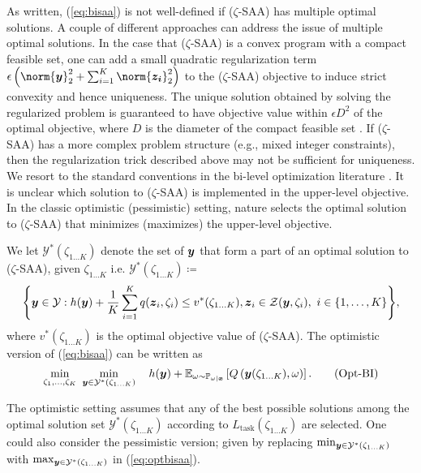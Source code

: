 As written, (\ref{eq:bisaa}) is not well-defined if \hbox{($\zeta$-SAA)} has multiple optimal solutions. A couple of different approaches can address the issue of multiple optimal solutions.  In the case that \hbox{($\zeta$-SAA)} is a convex program with a compact feasible set, one can add a small quadratic regularization term $\epsilon \left(\norm{\bs{y}}_2^2 + \sum_{i=1}^K \norm{\bs{z_i}}_2^2 \right)$ to the \hbox{($\zeta$-SAA)} objective to induce strict convexity and hence uniqueness. The unique solution obtained by solving the regularized problem is guaranteed to have objective value within $\epsilon D^2$ of the optimal objective, where $D$ is the diameter of the compact feasible set \hbox{\citep{wilder_melding}}. If \hbox{($\zeta$-SAA)} has a more complex problem structure (e.g., mixed integer constraints), then the regularization trick described above may not be sufficient for uniqueness. We resort to the standard conventions in the bi-level optimization literature \citep{sinha2017review}. It is unclear which solution to \hbox{($\zeta$-SAA)} is implemented in the upper-level objective. In the classic optimistic (pessimistic) setting, nature selects the optimal solution to \hbox{($\zeta$-SAA)} that minimizes (maximizes) the upper-level objective. 

We let $\mathcal{Y}^*(\zeta_{1\hdots K})$ denote the set of $\boldsymbol{y}$ that form a part of an optimal solution to \hbox{($\zeta$-SAA)}, given $\zeta_{1\hdots K}$ i.e. $\mathcal{Y}^*(\zeta_{1\hdots K}) \coloneq $
\begin{align}
  \Bigg{\{}\boldsymbol{y} \in \mathcal{Y} : h( \boldsymbol{y}) + \frac{1}{K}\sum_{i = 1}^K  q(\boldsymbol{z}_i, \zeta_i) \leq v^*(\zeta_{1\hdots K}), \nonumber 
 \boldsymbol{z}_i \in \mathcal{Z}(\boldsymbol{y}, \zeta_i), \ i \in \{1,\hdots ,K\} \Bigg{\}} , \nonumber
\end{align}
where $v^*(\zeta_{1 \hdots K})$ is the optimal objective value of \hbox{($\zeta$-SAA)}.
The optimistic version of (\ref{eq:bisaa}) can be written as
\begin{equation}\label{eq:optbisaa}
 \min_{\zeta_1, ... ,\zeta_K}\  \min_{\boldsymbol{y} \in \mathcal{Y}^*(\zeta_{1\hdots K})} \quad   h( \boldsymbol{y})+ \mathbb{E}_{\omega \sim \mathbb{P}_{\omega| \boldsymbol{x}}}\left[Q \left(\boldsymbol{y}(\zeta_{1...K}), \omega \right) \right].  \tag{Opt-BI}
\end{equation}

The optimistic setting assumes that any of the best possible solutions among the optimal solution set $\mathcal{Y}^*(\zeta_{1\hdots K})$ according to $L_{\text{task}}(\zeta_{1 \hdots K})$ are selected. One could also consider the pessimistic version; given by replacing $\min_{\boldsymbol{y} \in \mathcal{Y}^*(\zeta_{1\hdots K})} $ with $\max_{\boldsymbol{y} \in \mathcal{Y}^*(\zeta_{1\hdots K})}$ in (\ref{eq:optbisaa}).
 


